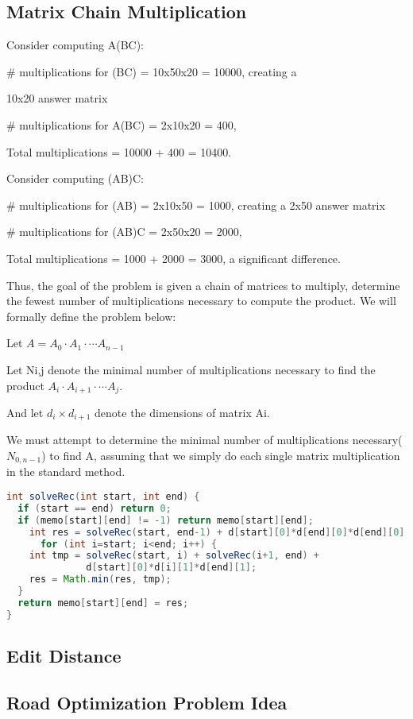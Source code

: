 \subsection*{Matrix Chain Multiplication}

Consider computing A(BC):

\# multiplications for (BC) = 10x50x20 = 10000, creating a

10x20 answer matrix

\# multiplications for A(BC) = 2x10x20 = 400,

Total multiplications = 10000 + 400 = 10400.

Consider computing (AB)C:

\# multiplications for (AB) = 2x10x50 = 1000, creating a 2x50
answer matrix

\# multiplications for (AB)C = 2x50x20 = 2000,

Total multiplications = 1000 + 2000 = 3000, a significant
difference.

Thus, the goal of the problem is given a chain of matrices to
multiply, determine the fewest number of multiplications
necessary to compute the product. We will formally define the
problem below:

Let $A = A_0\cdot A_1\cdot \cdots A_{n-1}$

Let Ni,j denote the minimal number of multiplications
necessary to find the product $A_i\cdot A_{i+1}\cdot\cdots A_j$.

And let $d_i\times d_{i+1}$
denote the dimensions of matrix Ai.

We must attempt to determine the minimal number of
multiplications necessary($N_{0,n-1}$) to find A, assuming that we
simply do each single matrix multiplication in the standard
method. 

\begin{lstlisting}[language=Java,basicstyle=\tiny]
int solveRec(int start, int end) {
  if (start == end) return 0;
  if (memo[start][end] != -1) return memo[start][end];
    int res = solveRec(start, end-1) + d[start][0]*d[end][0]*d[end][0];
      for (int i=start; i<end; i++) {
    int tmp = solveRec(start, i) + solveRec(i+1, end) +
              d[start][0]*d[i][1]*d[end][1];
    res = Math.min(res, tmp);
  }
  return memo[start][end] = res;
}
\end{lstlisting}

\subsection*{Edit Distance}
\lipsum[1][1-2]
\subsection*{Road Optimization Problem Idea}
\lipsum[1][1-2]
